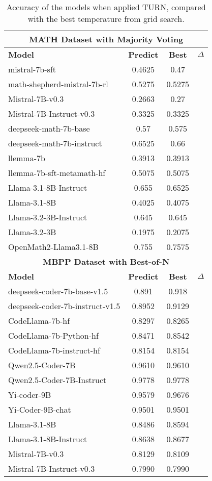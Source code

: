 \begin{table}[ht]
\centering
\caption{Accuracy of the models when applied \textsc{TURN}, compared with the best temperature from grid search.}
\label{table: accuracy}
\small
\centering
\begin{tabularx}{0.48\textwidth}{@{} l c c c @{}}
\toprule
\multicolumn{4}{c}{\textbf{MATH Dataset with Majority Voting}} \\
\midrule
\textbf{Model} & \textbf{Predict} & \textbf{Best} & $\Delta$\\
\midrule
mistral-7b-sft & 0.4625 & 0.47 & \\
math-shepherd-mistral-7b-rl & 0.5275 & 0.5275 \\
Mistral-7B-v0.3 & 0.2663 & 0.27 \\
Mistral-7B-Instruct-v0.3 & 0.3325 & 0.3325 \\
deepseek-math-7b-base & 0.57 & 0.575 \\
deepseek-math-7b-instruct & 0.6525 & 0.66 \\
llemma-7b & 0.3913 & 0.3913 \\
llemma-7b-sft-metamath-hf & 0.5075 & 0.5075 \\
Llama-3.1-8B-Instruct & 0.655 & 0.6525 \\
Llama-3.1-8B & 0.4025 & 0.4075 \\
Llama-3.2-3B-Instruct & 0.645 & 0.645 \\
Llama-3.2-3B & 0.1975 & 0.2075 \\
OpenMath2-Llama3.1-8B & 0.755 & 0.7575 \\
\midrule
\multicolumn{4}{c}{\textbf{MBPP Dataset with Best-of-N}} \\
\midrule
\textbf{Model} & \textbf{Predict} & \textbf{Best} & $\Delta$ \\
\midrule
deepseek-coder-7b-base-v1.5 & 0.891 & 0.918 \\
deepseek-coder-7b-instruct-v1.5 & 0.8952 & 0.9129 \\
CodeLlama-7b-hf & 0.8297 & 0.8265 \\
CodeLlama-7b-Python-hf & 0.8471 & 0.8542 \\
CodeLlama-7b-instruct-hf & 0.8154 & 0.8154 \\
Qwen2.5-Coder-7B & 0.9610 & 0.9610 \\
Qwen2.5-Coder-7B-Instruct & 0.9778 & 0.9778 \\
Yi-coder-9B & 0.9579 & 0.9676 \\
Yi-Coder-9B-chat & 0.9501 & 0.9501 \\
Llama-3.1-8B & 0.8486 & 0.8594 \\
Llama-3.1-8B-Instruct & 0.8638 & 0.8677 \\
Mistral-7B-v0.3 & 0.8129 & 0.8109 \\
Mistral-7B-Instruct-v0.3 & 0.7990 & 0.7990 \\
\bottomrule
\end{tabularx}
\end{table}